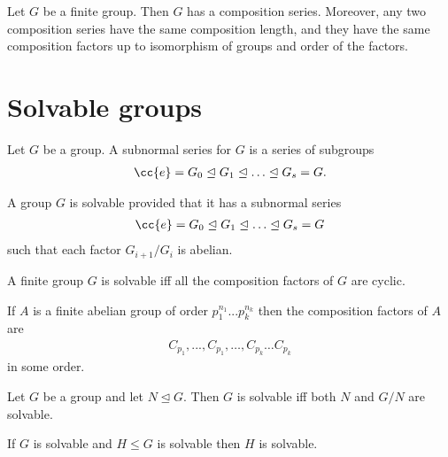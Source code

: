 \documentclass{article}
\begin{document}
\begin{theorem}
  Let $G$ be a finite group. Then $G$ has a composition series. Moreover, any two
  composition series have the same composition length, and they have the same composition
  factors up to isomorphism of groups and order of the factors.
\end{theorem}

\section{Solvable groups}

\begin{definition}
  Let $G$ be a group. A subnormal series for $G$ is a series of subgroups
  \begin{align*}
    \cc{e}=G_0\trianglelefteq G_1\trianglelefteq\ldots\trianglelefteq G_s = G.
  \end{align*}
\end{definition}

\begin{definition}
  A group $G$ is solvable provided that it has a subnormal series
  \begin{align*}
    \cc{e}=G_0\trianglelefteq G_1\trianglelefteq\ldots\trianglelefteq G_s = G
  \end{align*}
  such that each factor $G_{i+1}/G_i$ is abelian.
\end{definition}

\begin{theorem}
  A finite group $G$ is solvable iff all the composition factors of $G$ are cyclic.
\end{theorem}

\begin{lemma}
  If $A$ is a finite abelian group of order $p_1^{n_1}...p_k^{n_k}$ then the composition
  factors of $A$ are
  \begin{align*}
    C_{p_1},...,C_{p_1},\ldots,C_{p_k}\ldots C_{p_k}
  \end{align*}
  in some order.
\end{lemma}

\begin{theorem}
  Let $G$ be a group and let $N\trianglelefteq G$. Then $G$ is solvable iff both $N$ and
  $G/N$ are solvable.
\end{theorem}

\begin{theorem}
  If $G$ is solvable and $H\leq G$ is solvable then $H$ is solvable.
\end{theorem}
\end{document}
